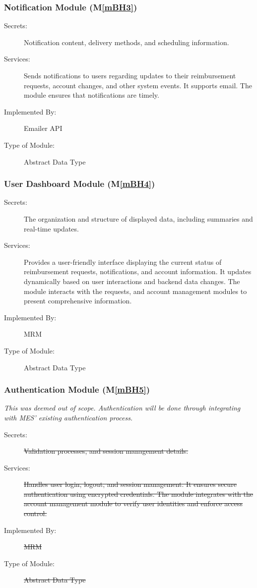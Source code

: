 \documentclass[12pt, titlepage]{article}
\newcommand{\mref}[1]{M\ref{#1}}
\begin{document}
\subsubsection{Notification Module (\mref{mBH3})}

\begin{description}
\item[Secrets:] Notification content, delivery methods, and scheduling information.
\item[Services:] Sends notifications to users regarding updates to their reimbursement requests, account changes, and other system events. It supports email. The module ensures that notifications are timely.
\item[Implemented By:] Emailer API
\item[Type of Module:] Abstract Data Type
\end{description}

\subsubsection{User Dashboard Module (\mref{mBH4})}

\begin{description}
\item[Secrets:] The organization and structure of displayed data, including summaries and real-time updates.
\item[Services:] Provides a user-friendly interface displaying the current status of reimbursement requests, notifications, and account information. It updates dynamically based on user interactions and backend data changes. The module interacts with the requests, and account management modules to present comprehensive information.
\item[Implemented By:] MRM
\item[Type of Module:] Abstract Data Type
\end{description}

\subsubsection{Authentication Module (\mref{mBH5})}
\textit{This was deemed out of scope. Authentication will be done through integrating with MES' existing authentication process.}
\begin{description}
\item[Secrets:] \st{Validation processes, and session management details.}
\item[Services:] \st{Handles user login, logout, and session management. It ensures secure authentication using encrypted credentials. The module integrates with the account management module to verify user identities and enforce access control.}
\item[Implemented By:] \st{MRM}
\item[Type of Module:] \st{Abstract Data Type} 
\end{description}
\end{document}
